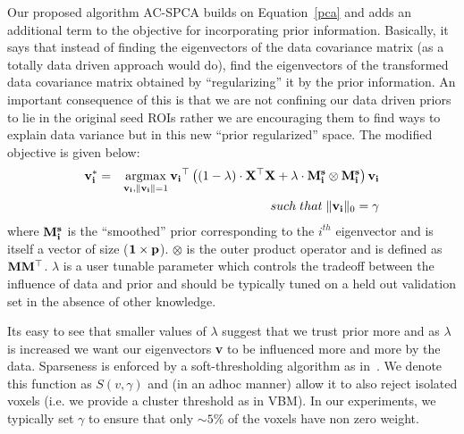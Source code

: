 \documentclass{llncs}
\newcommand{\argmax}{\operatornamewithlimits{argmax}}
\begin{document}
Our proposed algorithm AC-SPCA builds on Equation~\ref{pca} and adds an additional term to the objective for incorporating prior information. Basically, it says that instead of finding the eigenvectors of the data covariance matrix (as a totally data driven approach would do), find the eigenvectors of the transformed data covariance matrix obtained by ``regularizing'' it by the prior information. An important consequence of this is that we are not confining our data driven priors to lie in the original seed ROIs rather we are encouraging them to find ways to explain data variance but in this new ``prior regularized'' space. The modified objective is given below:
\begin{eqnarray}
\label{ppca}
{\bf v_i^*}&=& \argmax_{{\bf v_i},{\bf \|v_i\|}=1} {\bf v_i}^{\top}\left((1-\lambda)\cdot{\bf X^{\top}X +  \lambda\cdot M^s_i\otimes M^s_i}\right){\bf v_i}  \\
\nonumber
&&such\;that\;\|{\bf v_i}\|_0=\gamma
\end{eqnarray}
where ${\bf M^s_i}$ is  the ``smoothed'' prior corresponding to the $i^{th}$ eigenvector and is itself a vector of size (${\bf 1\times p}$). $\otimes$ is the outer product operator and is defined as $\bf MM^{\top}$.  $\lambda$ is a user tunable parameter which controls the tradeoff between the influence of data and prior and should be typically tuned on a held out validation set in the absence of other knowledge. 

Its easy to see that smaller values of $\lambda$ suggest that we trust prior more and as $\lambda$ is increased we want our eigenvectors {\bf v} to be influenced more and more by the data. Sparseness is enforced by a soft-thresholding algorithm as in~\cite{zou2006sparse,Witten2009b}. We denote this function as $S(v,\gamma)$ and (in an adhoc manner) allow it to also reject isolated voxels (i.e. we provide a cluster threshold as in VBM). In our experiments, we typically set $\gamma$ to ensure that only $\sim5\%$ of the voxels have non zero weight.



\end{document}
